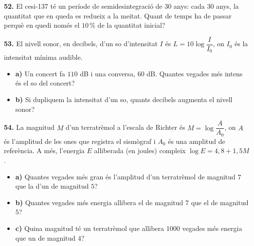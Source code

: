 \documentclass[13pt,a4paper]{extarticle}
\begin{document}
\par\noindent\begin{minipage}{\linewidth}
\textbf{52.} El cesi-137 té un període de semidesintegració de $30$ anys: cada $30$ anys, la quantitat que en queda es redueix a la meitat. Quant de temps ha de passar perquè en quedi només el $10\,\%$ de la quantitat inicial?\par
\end{minipage}\par\vspace{1.6mm}
\par\noindent\begin{minipage}{\linewidth}
\textbf{53.} El nivell sonor, en decibels, d'un so d'intensitat $I$ és $L=10\log\dfrac{I}{I_0}$, on $I_0$ és la intensitat mínima audible.\par

\begin{itemize}[leftmargin=0pt,itemsep=6pt,topsep=4pt,parsep=0pt,label={}]
\item \textbf{a)} Un concert fa $110$ dB i una conversa, $60$ dB. Quantes vegades més intens és el so del concert?
\item \textbf{b)} Si dupliquem la intensitat d'un so, quants decibels augmenta el nivell sonor?
\end{itemize}
\end{minipage}\par\vspace{1.6mm}
\par\noindent\begin{minipage}{\linewidth}
\textbf{54.} La magnitud $M$ d'un terratrèmol a l'escala de Richter és $M=\log\dfrac{A}{A_0}$, on $A$ és l'amplitud de les ones que registra el sismògraf i $A_0$ és una amplitud de referència. A més, l'energia $E$ alliberada (en joules) compleix $\log E=4{,}8+1{,}5M$.\par

\begin{itemize}[leftmargin=0pt,itemsep=6pt,topsep=4pt,parsep=0pt,label={}]
\item \textbf{a)} Quantes vegades més gran és l'amplitud d'un terratrèmol de magnitud $7$ que la d'un de magnitud $5$?
\item \textbf{b)} Quantes vegades més energia allibera el de magnitud $7$ que el de magnitud $5$?
\item \textbf{c)} Quina magnitud té un terratrèmol que allibera $1000$ vegades més energia que un de magnitud $4$?
\end{itemize}
\end{minipage}\par\vspace{1.6mm}
\end{document}
